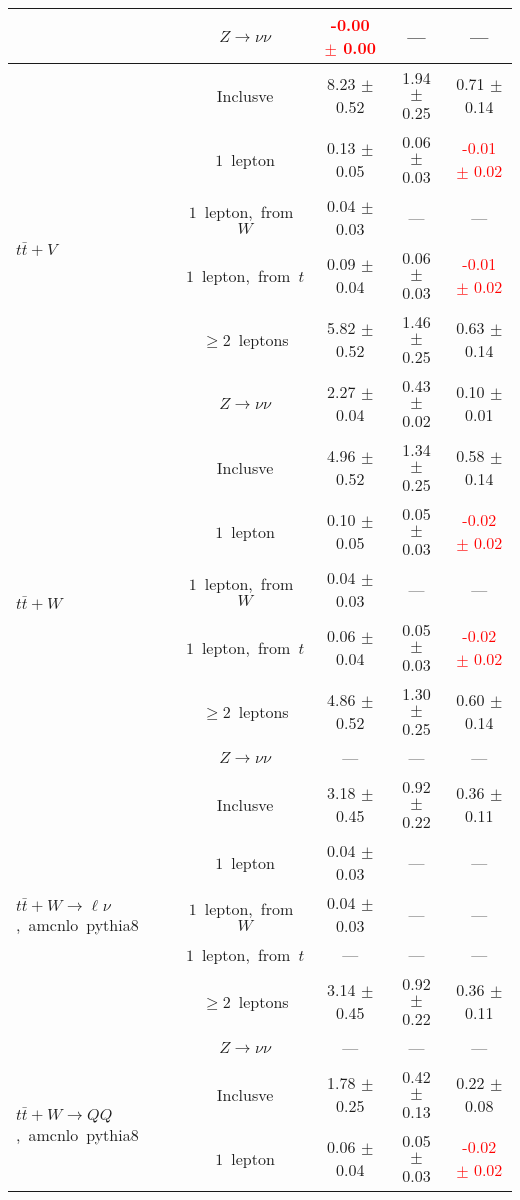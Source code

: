 \documentclass{article}
\begin{document}
\begin{longtable}{|l|c|c|c|c|}
 & $Z\rightarrow\nu\nu$  & \textcolor{red}{ -0.00 $\pm$ 0.00 }  & ---  & --- \\* 
\hline 
\multirow{6}{*}{$t\bar{t}+V$} & Inclusve  & 8.23 $\pm$ 0.52  & 1.94 $\pm$ 0.25  & 0.71 $\pm$ 0.14 \\* 
 & $1$~lepton  & 0.13 $\pm$ 0.05  & 0.06 $\pm$ 0.03  & \textcolor{red}{ -0.01 $\pm$ 0.02 } \\* 
 & $1$~lepton,~from~$W$  & 0.04 $\pm$ 0.03  & ---  & --- \\* 
 & $1$~lepton,~from~$t$  & 0.09 $\pm$ 0.04  & 0.06 $\pm$ 0.03  & \textcolor{red}{ -0.01 $\pm$ 0.02 } \\* 
 & $\ge2$~leptons  & 5.82 $\pm$ 0.52  & 1.46 $\pm$ 0.25  & 0.63 $\pm$ 0.14 \\* 
 & $Z\rightarrow\nu\nu$  & 2.27 $\pm$ 0.04  & 0.43 $\pm$ 0.02  & 0.10 $\pm$ 0.01 \\* 
\hline 
\multirow{6}{*}{$t\bar{t}+W$} & Inclusve  & 4.96 $\pm$ 0.52  & 1.34 $\pm$ 0.25  & 0.58 $\pm$ 0.14 \\* 
 & $1$~lepton  & 0.10 $\pm$ 0.05  & 0.05 $\pm$ 0.03  & \textcolor{red}{ -0.02 $\pm$ 0.02 } \\* 
 & $1$~lepton,~from~$W$  & 0.04 $\pm$ 0.03  & ---  & --- \\* 
 & $1$~lepton,~from~$t$  & 0.06 $\pm$ 0.04  & 0.05 $\pm$ 0.03  & \textcolor{red}{ -0.02 $\pm$ 0.02 } \\* 
 & $\ge2$~leptons  & 4.86 $\pm$ 0.52  & 1.30 $\pm$ 0.25  & 0.60 $\pm$ 0.14 \\* 
 & $Z\rightarrow\nu\nu$  & ---  & ---  & --- \\* 
\hline 
\multirow{6}{*}{$t\bar{t}+W{\rightarrow}{\ell}{\nu}$,~amcnlo~pythia8} & Inclusve  & 3.18 $\pm$ 0.45  & 0.92 $\pm$ 0.22  & 0.36 $\pm$ 0.11 \\* 
 & $1$~lepton  & 0.04 $\pm$ 0.03  & ---  & --- \\* 
 & $1$~lepton,~from~$W$  & 0.04 $\pm$ 0.03  & ---  & --- \\* 
 & $1$~lepton,~from~$t$  & ---  & ---  & --- \\* 
 & $\ge2$~leptons  & 3.14 $\pm$ 0.45  & 0.92 $\pm$ 0.22  & 0.36 $\pm$ 0.11 \\* 
 & $Z\rightarrow\nu\nu$  & ---  & ---  & --- \\* 
\hline 
\multirow{6}{*}{$t\bar{t}+W{\rightarrow}QQ$,~amcnlo~pythia8} & Inclusve  & 1.78 $\pm$ 0.25  & 0.42 $\pm$ 0.13  & 0.22 $\pm$ 0.08 \\* 
 & $1$~lepton  & 0.06 $\pm$ 0.04  & 0.05 $\pm$ 0.03  & \textcolor{red}{ -0.02 $\pm$ 0.02 } \\* 

\end{longtable}
\end{document}
